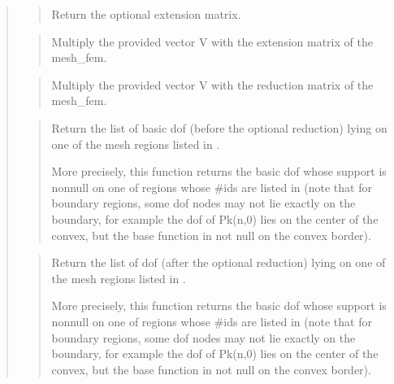\documentclass[a4paper,11pt,english]{sphinxmanual}
\begin{document}
\begin{quote}
\begin{quote}

Return the optional extension matrix.
\end{quote}

\begin{quote}

Multiply the provided vector V with the extension matrix of the mesh\_fem.
\end{quote}

\begin{quote}

Multiply the provided vector V with the reduction matrix of the mesh\_fem.
\end{quote}

\begin{quote}

Return the list of basic dof (before the optional reduction) lying on one
of the mesh regions listed in .

More precisely, this function returns the basic dof whose support is
non\sphinxhyphen{}null on one of regions whose \#ids are listed in  (note
that for boundary regions, some dof nodes may not lie exactly
on the boundary, for example the dof of Pk(n,0) lies on the center
of the convex, but the base function in not null on the convex
border).
\end{quote}

\begin{quote}

Return the list of dof (after the optional reduction) lying on one
of the mesh regions listed in .

More precisely, this function returns the basic dof whose support is
non\sphinxhyphen{}null on one of regions whose \#ids are listed in  (note
that for boundary regions, some dof nodes may not lie exactly
on the boundary, for example the dof of Pk(n,0) lies on the center
of the convex, but the base function in not null on the convex
border).


\end{quote}
\end{quote}
\end{document}
